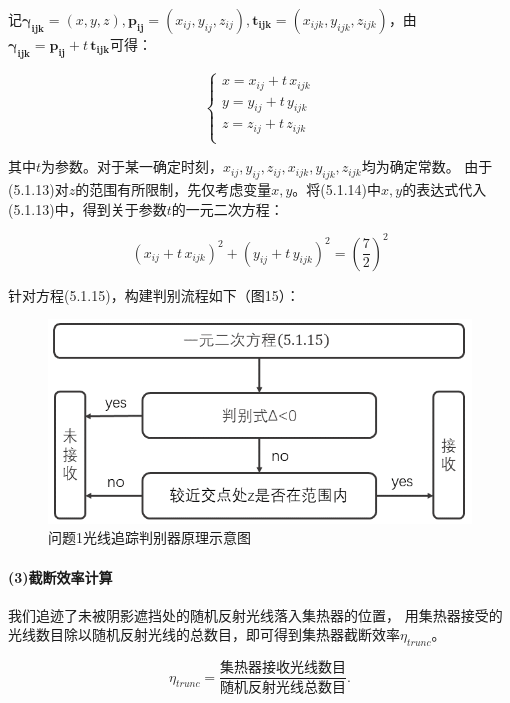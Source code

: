 \documentclass{article}
\numberwithin{equation}{subsection}
\begin{document}
\noindent
记$\bm{\gamma_{ijk}}=(x,y,z),\bm{p_{ij}}=(x_{ij},y_{ij},z_{ij}),\bm{t_{ijk}}=(x_{ijk},y_{ijk},z_{ijk})$，由$\bm{\gamma_{ijk}}=\bm{p_{ij}}+t\,\bm{t_{ijk}}$可得：

\begin{equation}
    \left\{\begin{array}{l}
        x=x_{ij}+t\,x_{ijk}\\
        y=y_{ij}+t\,y_{ijk}\\
        z=z_{ij}+t\,z_{ijk}\\
    \end{array}\right.
\end{equation}

\noindent
其中$t$为参数。对于某一确定时刻，$x_{ij},y_{ij},z_{ij},x_{ijk},y_{ijk},z_{ijk}$均为确定常数。
由于(5.1.13)对$z$的范围有所限制，先仅考虑变量$x,y$。将(5.1.14)中$x,y$的表达式代入(5.1.13)中，得到关于参数$t$的一元二次方程：

\begin{equation}
        (x_{ij}+t\,x_{ijk})^2+(y_{ij}+t\,y_{ijk})^2=(\frac{7}{2})^2
\end{equation}

\vskip 0.25cm
\noindent
针对方程(5.1.15)，构建判别流程如下（图15）：
\begin{figure}[H]
    \centering
    \includegraphics[scale=0.45]{问题1-1光线追踪判别器原理示意图.png}
    \caption{问题1光线追踪判别器原理示意图}
\end{figure}

\paragraph{(3)截断效率计算}
我们追迹了未被阴影遮挡处的随机反射光线落入集热器的位置，
用集热器接受的光线数目除以随机反射光线的总数目，即可得到集热器截断效率$\eta_{trunc}$。

\begin{equation}
    \eta_{trunc}=\frac{\text{集热器接收光线数目}}{\text{随机反射光线总数目}}.
\end{equation}
\end{document}
